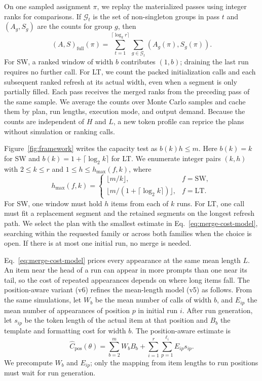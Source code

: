On one sampled assignment $\pi$, we replay the materialized passes using integer ranks for comparisons. If $\mathcal G_t$ is the set of non-singleton groups in pass $t$ and $(A_g,S_g)$ are the counts for group $g$, then
\begin{equation}
  (A,S)_{\mathrm{full}}(\pi)=
  \sum_{t=1}^{\lceil\log_k r\rceil}
  \sum_{g\in\mathcal G_t}(A_g(\pi),S_g(\pi)).
  \label{eq:total-merge-cost}
\end{equation}
For SW, a ranked window of width $b$ contributes $(1,b)$; draining the last run requires no further call. For LT, we count the packed initialization calls and each subsequent ranked refresh at its actual width, even when a segment is only partially filled. Each pass receives the merged ranks from the preceding pass of the same sample. We average the counts over Monte Carlo samples and cache them by plan, run lengths, execution mode, and output demand. Because the counts are independent of $H$ and $L$, a new token profile can reprice the plans without simulation or ranking calls.

Figure~\ref{fig:framework} writes the capacity test as $b(k)h\leq m$. Here $b(k)=k$ for SW and $b(k)=1+\lceil\log_2 k\rceil$ for LT. We enumerate integer pairs $(k,h)$ with $2\leq k\leq r$ and $1\leq h\leq h_{\max}(f,k)$, where
\begin{equation}
 h_{\max}(f,k)=
 \begin{cases}
   \lfloor m/k\rfloor, & f=\mathrm{SW},\\
   \lfloor m/(1+\lceil\log_2 k\rceil)\rfloor, & f=\mathrm{LT}.
 \end{cases}
 \label{eq:merge-capacity}
\end{equation}
For SW, one window must hold $h$ items from each of $k$ runs. For LT, one call must fit a replacement segment and the retained segments on the longest refresh path. We select the plan with the smallest estimate in Eq.~\eqref{eq:merge-cost-model}, searching within the requested family or across both families when the choice is open. If there is at most one initial run, no merge is needed.

Eq.~\eqref{eq:merge-cost-model} prices every appearance at the same mean length $L$. An item near the head of a run can appear in more prompts than one near its tail, so the cost of repeated appearances depends on where long items fall. The position-aware variant (v6) refines the mean-length model (v5) as follows. From the same simulations, let $W_b$ be the mean number of calls of width $b$, and $E_{ip}$ the mean number of appearances of position $p$ in initial run $i$. After run generation, let $s_{ip}$ be the token length of the actual item at that position and $B_b$ the template and formatting cost for width $b$. The position-aware estimate is
\begin{equation}
  \widehat C_{\mathrm{pos}}(\theta)=
  \sum_{b=2}^{m}W_b B_b+
  \sum_{i=1}^{r}\sum_{p=1}^{\ell_i}E_{ip}s_{ip}.
  \label{eq:cost-position-aware}
\end{equation}
We precompute $W_b$ and $E_{ip}$; only the mapping from item lengths to run positions must wait for run generation.

